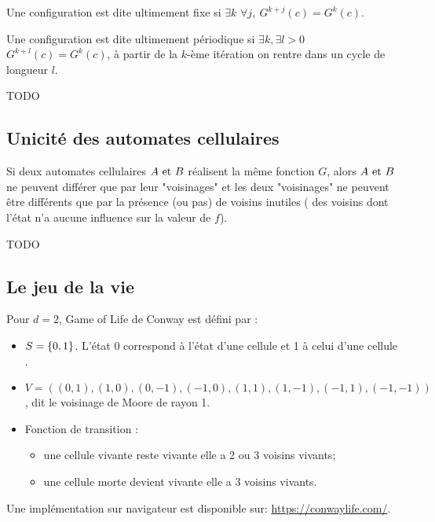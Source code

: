 \begin{definition}
	Une configuration est dite ultimement fixe si $\exists k$ \tq $\forall j, \ G^{k+j}(c) =  G^{k}(c)$.
\end{definition}


\begin{definition}
	Une configuration est dite ultimement périodique si $\exists k, \exists l>0$ \tq $ G^{k+l}(c) =  G^{k}(c)$,
	\ie à partir de la $k$-ème itération on rentre dans un cycle de longueur $l$.
\end{definition}


\begin{exemple}
	TODO
\end{exemple}


\subsection{Unicité des automates cellulaires}


\begin{theorem}
	Si deux automates cellulaires $A \text{ et } B$ réalisent la même fonction $G$, alors $A \text{ et } B$ ne peuvent différer que par
	leur "voisinages" et les deux "voisinages" ne peuvent être différents que par la présence (ou pas) de voisins inutiles (\cad
	des voisins dont l'état n'a aucune influence sur la valeur de $f$).
\end{theorem}


\begin{exemple}
	TODO
\end{exemple}

\subsection{Le jeu de la vie}

\begin{exemple}
	Pour $d = 2$, Game of Life de Conway \cite{conwayGOL} est défini par :
	\begin{itemize}
		\item $S = \left\{0,1\right\}$. L'état 0 correspond à l'état d'une cellule  et 1 à celui d'une cellule .
		\item $V = ((0,1), (1,0), (0,-1), (-1,0), (1,1), (1,-1), (-1,1), (-1,-1))$, dit le voisinage de Moore de rayon 1.
		\item Fonction de transition :
		      \begin{itemize}
			      \item une cellule vivante reste vivante \ssi elle a 2 ou 3 voisins vivants;
			      \item une cellule morte devient vivante \ssi elle a 3 voisins vivants.
		      \end{itemize}
	\end{itemize}

	Une implémentation sur navigateur est disponible sur: \url{https://conwaylife.com/}.
\end{exemple}

